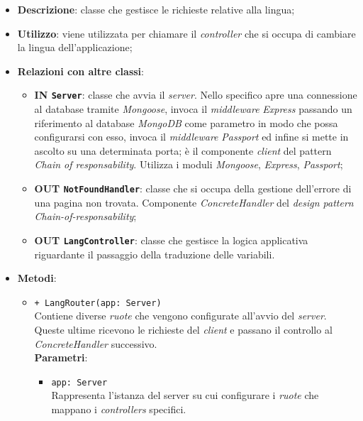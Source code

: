 	\begin{itemize}
		\item \textbf{Descrizione}: classe che gestisce le richieste relative alla lingua;
		\item \textbf{Utilizzo}: viene utilizzata per chiamare il \textit{controller} che si occupa di cambiare la lingua dell'applicazione;
		\item \textbf{Relazioni con altre classi}:
			\begin{itemize}
				\item \textbf{IN \texttt{Server}}: classe che avvia il \textit{server}. Nello specifico apre una connessione al database tramite \textit{Mongoose}, invoca il \textit{middleware} \textit{Express} passando un riferimento al database \textit{MongoDB} come parametro in modo che possa configurarsi con esso, invoca il \textit{middleware} \textit{Passport} ed infine si mette in ascolto su una determinata porta; è il componente \textit{client} del pattern \textit{Chain of responsability}. Utilizza i moduli \textit{Mongoose}, \textit{Express}, \textit{Passport};
				\item \textbf{OUT \texttt{NotFoundHandler}}: classe che si occupa della gestione dell'errore di una pagina non trovata. Componente \textit{ConcreteHandler} del \textit{design pattern} \textit{Chain-of-responsability};
				\item \textbf{OUT \texttt{LangController}}: classe che gestisce la logica applicativa riguardante il passaggio della traduzione delle variabili.
			\end{itemize}
		\item \textbf{Metodi}:
			\begin{itemize}
				\item \texttt{+ LangRouter(app: Server)} \\
				Contiene diverse \textit{ruote} che vengono configurate all'avvio del \textit{server}. Queste ultime ricevono le richieste del \textit{client} e passano il controllo al \textit{ConcreteHandler} successivo. \\
				\textbf{Parametri}:
					\begin{itemize}
						\item \texttt{app: Server} \\
						Rappresenta l'istanza del server su cui configurare i \textit{ruote} che mappano i \textit{controllers} specifici.
					\end{itemize}
			\end{itemize}
	\end{itemize}